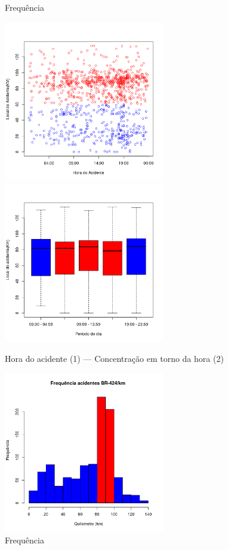 \quad \quad
\begin{figure}[h]
	\centering
	\caption{ Frequência}
\end{figure}


\pagebreak

\begin{figure}[h]
	\caption{Hora do acidente (1) --- Concentração em torno da hora (2)}
	\includegraphics[width=7cm,height=7cm]{Figuras/Preprocess/br424_1.png}
	\includegraphics[width=7cm,height=7cm]{Figuras/Preprocess/br424_2.png}
	
\end{figure}

\quad \quad
\begin{figure}[h]
	\centering
	\caption{ Frequência}
	\includegraphics[width=7cm,height=7cm]{Figuras/Preprocess/br424_3.png}
\end{figure}


